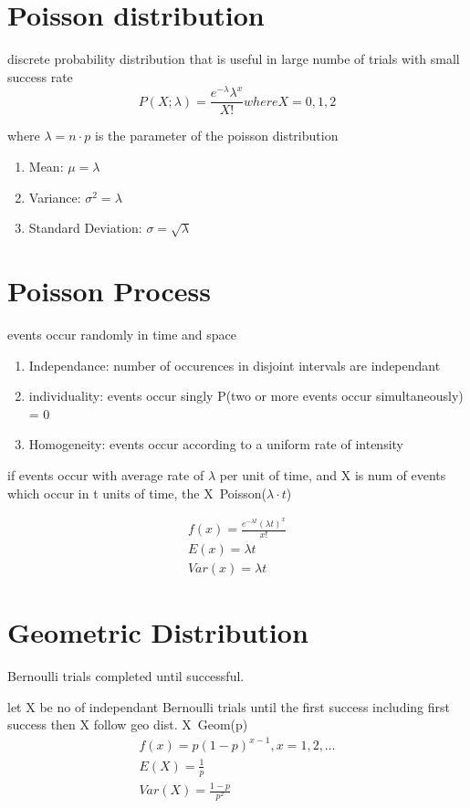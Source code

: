 \documentclass[11pt]{amsart}
\begin{document}
\section{Poisson distribution}
\par discrete probability distribution that is useful in large numbe of trials
with small success rate
\begin{equation}
  P(X;\lambda) = \frac{e^{-\lambda} \lambda^x}{X!} where X = 0,1,2
\end{equation}
\par where $\lambda = n \cdot p$ is the parameter of the poisson distribution
\begin{enumerate}
  \item Mean: $\mu = \lambda$
  \item Variance: $\sigma^2 = \lambda$
  \item Standard Deviation: $\sigma = \sqrt{\lambda}$
\end{enumerate}
\section{Poisson Process}
\par events occur randomly in time and space
\begin{enumerate}
  \item Independance: number of occurences in disjoint intervals are independant
  \item individuality: events occur singly P(two or more events occur simultaneously) = 0
  \item Homogeneity: events occur according to a uniform rate of intensity
\end{enumerate}
\par if events occur with average rate of $\lambda$ per unit of time, and X is
num of events which occur in t units of time, the X~Poisson($\lambda\cdot t$)
\begin{equation *}

  \begin{align}
    f(x)  = \frac{e^{-\lambda t}(\lambda t)^x}{x!}\\
    E(x) = \lambda t\\
    Var(x) = \lambda t
  \end{align}
\end{equation *}
\section{Geometric Distribution}
\par Bernoulli trials completed until successful.
\par let X be no of independant Bernoulli trials until the first success including first success then X follow geo dist. X~Geom(p)
\begin{equation}
  \begin{align*}
    f(x) = p(1-p)^{x-1}, x = 1,2,\dots\\
    E(X) = \frac{1}{p}\\
    Var(X) = \frac{1-p}{p^2}
  \end{align*}
\end{equation}
\end{document}
